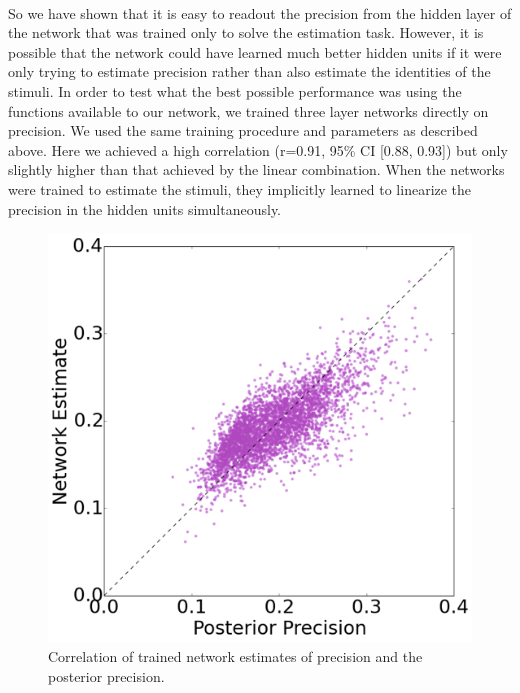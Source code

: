 \documentclass{article} %
\begin{document}
\\
So we have shown that it is easy to readout the precision from the hidden layer of the network that was trained only to solve the estimation task. However, it is possible that the network could have learned much better hidden units if it were only trying to estimate precision rather than also estimate the identities of the stimuli. In order to test what the best possible performance was using the functions available to our network, we trained three layer networks directly on precision. We used the same training procedure and parameters as described above. Here we achieved a high correlation (r=0.91, 95\% CI [0.88, 0.93]) but only slightly higher than that achieved by the linear combination. When the networks were trained to estimate the stimuli, they implicitly learned to linearize the precision in the hidden units simultaneously.
\begin{figure}[h]
\centering
\includegraphics[width = .5\textwidth]{Linear_Fixed_Gains_Precisions.png}
\caption{Correlation of trained network estimates of precision and the posterior precision.}
\end{figure}
\end{document}
